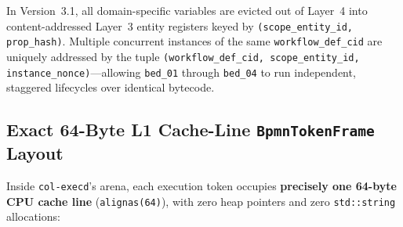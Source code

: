 In Version~3.1, all domain-specific variables are evicted out of Layer~4 into
content-addressed Layer~3 entity registers keyed by \texttt{(scope\_entity\_id,
prop\_hash)}. Multiple concurrent instances of the same \texttt{workflow\_def\_cid} are
uniquely addressed by the tuple \texttt{(workflow\_def\_cid, scope\_entity\_id,
instance\_nonce)}---allowing \texttt{bed\_01} through \texttt{bed\_04} to run independent,
staggered lifecycles over identical bytecode.

\subsection{Exact 64-Byte L1 Cache-Line \texttt{BpmnTokenFrame} Layout}

Inside \texttt{col-execd}'s arena, each execution token occupies \textbf{precisely one
64-byte CPU cache line} (\texttt{alignas(64)}), with zero heap pointers and zero
\texttt{std::string} allocations:

